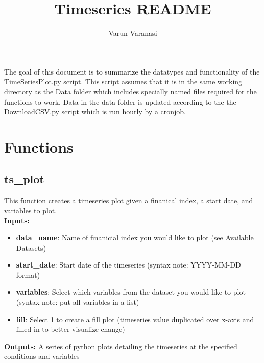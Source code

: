 \documentclass{article}
\title{Timeseries README}
\author{Varun Varanasi}
\begin{document}
\maketitle

The goal of this document is to summarize the datatypes and functionality of the TimeSeriesPlot.py script. 
This script assumes that it is in the same working directory as the Data folder which includes specially named files required for the functions to work.
Data in the data folder is updated according to the the DownloadCSV.py script which is run hourly by a cronjob. 

\section*{Functions}

\subsection*{ts\_plot}
This function creates a timeseries plot given a finanical index, a start date, and variables to plot. \\
\textbf{Inputs:}
\begin{itemize}
    \item \textbf{data\_name}: Name of finanicial index you would like to plot (see Available Datasets) 
    \item \textbf{start\_date}: Start date of the timeseries (syntax note:  YYYY-MM-DD format)
    \item \textbf{variables}: Select which variables from the dataset you would like to plot (syntax note: put all variables in a list)
    \item \textbf{fill}: Select 1 to create a fill plot (timeseries value duplicated over x-axis and filled in to better visualize change)
\end{itemize}
\textbf{Outputs:} A series of python plots detailing the timeseries at the specified conditions and variables
\\
\end{document}
